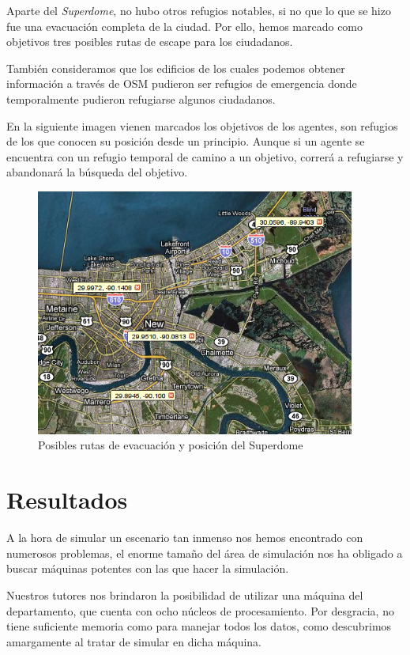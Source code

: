 Aparte del {\em Superdome}, no hubo otros refugios notables, si no que lo que se
hizo fue una evacuación completa de la ciudad. Por ello, hemos marcado como
objetivos tres posibles rutas de escape para los ciudadanos.

También consideramos que los edificios de los cuales podemos obtener
información a través de OSM pudieron ser refugios de emergencia donde
temporalmente pudieron refugiarse algunos ciudadanos.

En la siguiente imagen vienen marcados los objetivos de los agentes, son
refugios de los que conocen su posición desde un principio. Aunque si un agente
se encuentra con un refugio temporal de camino a un objetivo, correrá a
refugiarse y abandonará la búsqueda del objetivo.

\begin{figure}[H]
 \centering
 \includegraphics[width=105mm]{figuras/cap6/evacuation.png}
 \caption{Posibles rutas de evacuación y posición del Superdome}
\end{figure}

\section{Resultados}

A la hora de simular un escenario tan inmenso nos hemos encontrado con
numerosos problemas, el enorme tamaño del área de simulación nos ha obligado a
buscar máquinas potentes con las que hacer la simulación.

Nuestros tutores nos brindaron la posibilidad de utilizar una máquina del
departamento, que cuenta con ocho núcleos de procesamiento. Por desgracia, no
tiene suficiente memoria como para manejar todos los datos, como descubrimos
amargamente al tratar de simular en dicha máquina.

